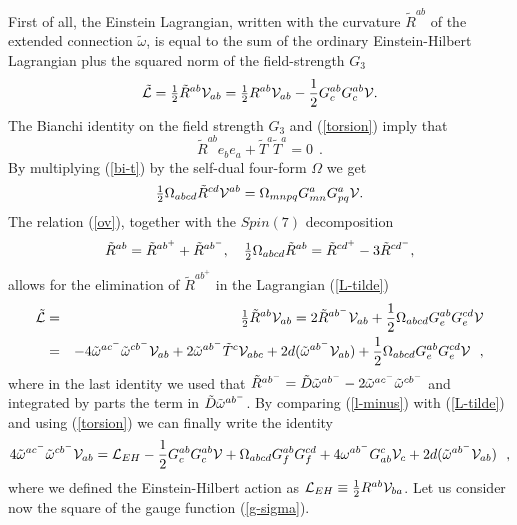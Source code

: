 \documentclass[a4paper,12pt]{article}
\def\demi{{\textstyle {1\over2}}}
\let\nn=\nonumber
\def\V{{\cal V}}
\def\ot{\tilde\o}
\def\tD{\tilde D}
\begin{document}
First of all, the Einstein Lagrangian, written with the curvature
$\tilde R^{ab}$ of the extended connection $\tilde\omega$, is equal to the
sum of the ordinary Einstein-Hilbert Lagrangian
plus the squared norm of the field-strength $G_3$
\begin{equation}
\tilde {\cal L} = \demi \tilde R^{ab}{\cal V}_{ab}
= \demi R^{ab}{\cal V}_{ab} - {1\over 2} G^{ab}_c G^{ab}_c 
{\cal V}.
\label{L-tilde}
\end{equation}
The Bianchi identity on
the field strength $G_3$ and (\ref{torsion}) imply that 
\begin{equation}
\tilde R^{ab}e_b e_a + \tilde T^a\tilde T^a = 0 \ \ .
\label{bi-t}
\end{equation}
By multiplying (\ref{bi-t}) by the self-dual four-form $\Omega$ we get 
\begin{equation}
\demi \O_{abcd}\tilde R^{cd} {\cal V}^{ab} =
\O_{mnpq}G^a_{mn}G^a_{pq} {\cal V}.
\label{ov}
\end{equation}
The relation (\ref{ov}), together with the $Spin(7)$
decomposition  
\begin{equation}\label{deco}
\tilde R^{ab}= \tilde R^{ab^+}+ \tilde R^{ab^-}, 
\quad \demi \O_{abcd} \tilde R^{ab}= \tilde R^{cd^+}-3 \tilde R^{cd^-} ,
\end{equation}
allows for the elimination of $\tilde R^{ab^+}$ in the Lagrangian
(\ref{L-tilde})
\begin{eqnarray}
\label{l-minus}
\tilde {\cal L} &=& \demi \tilde R^{ab}{\cal V}_{ab} = 
2\tilde R^{ab^-} {\cal V}_{ab} + {1\over 2}
\O_{abcd}G^{ab}_e G^{cd}_e {\cal V} \\
&=& -4 \tilde\o^{ac^-}\tilde\o^{cb^-}{\cal V}_{ab}
+ 2 \tilde\o^{ab^-}\tilde T^c \V_{abc}
+2d(\tilde\o^{ab^-}\V_{ab})
+{1\over 2}\O_{abcd}G^{ab}_e G^{cd}_e {\cal V}
\ \ ,
\nn
\end{eqnarray} 
where in the last identity we used that $\tilde R^{ab^-}=\tilde D\tilde{\omega}^{ab^-}
-2\tilde{\omega}^{ac^-}\tilde{\omega}^{cb^-}$ and integrated by parts the term in
$\tD\ot^{ab^-}$. By comparing (\ref{l-minus}) with (\ref{L-tilde})
and using (\ref{torsion}) we can finally write the identity
\begin{equation}
 4 \tilde\o^{ac^-}\tilde\o^{cb^-}{\cal V}_{ab}=
{\cal L}_{EH} - {1\over 2}G^{ab}_c G^{ab}_c\V
+\O_{abcd}G^{ab}_f G^{cd}_f
+4 \o^{ab^-}G_{ab}^c\V_c
+2 d(\ot^{ab^-}\V_{ab}) \ \ ,
\label{omega^2}
\end{equation}
where we defined the Einstein-Hilbert action as
${\cal L}_{EH}\equiv \demi R^{ab}\V_{ba}$.
Let us consider now the square of the gauge function (\ref{g-sigma}).
\end{document}
